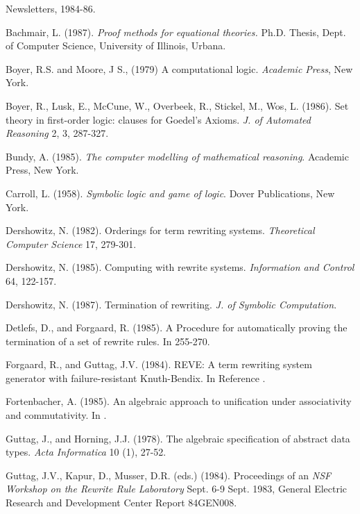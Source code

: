 \begin{thebibliography}{99}

 Newsletters, 1984-86.
 
Bachmair, L. (1987). {\em Proof methods for
equational theories.} Ph.D. Thesis, Dept. of Computer Science,
University of Illinois, Urbana.

Boyer, R.S. and Moore, J S., (1979) A computational logic.
{\em Academic Press}, New York.

Boyer, R., Lusk, E., McCune, W., Overbeek, R.,
Stickel, M., Wos, L. (1986). Set theory in first-order logic: clauses
for Goedel's Axioms. {\em J. of Automated Reasoning} 2, 3, 287-327.

Bundy, A. (1985). {\em The computer modelling of
mathematical reasoning}. Academic Press, New York.

Carroll, L. (1958). {\em Symbolic logic and game of
logic}.  Dover Publications, New York.

Dershowitz, N. (1982). Orderings for term
rewriting systems. {\em Theoretical Computer Science} 17, 279-301.

Dershowitz, N. (1985). Computing with
rewrite systems. {\em Information and Control} 64, 122-157.

Dershowitz, N. (1987). Termination of rewriting.
{\em J. of Symbolic Computation}.

Detlefs, D., and Forgaard, R. (1985). A
Procedure for automatically proving the termination of a set of
rewrite rules. 
In \cite{RTA85} 
255-270.

Forgaard, R., and Guttag, J.V. (1984). REVE:
A term rewriting system generator with failure-resistant Knuth-Bendix.
In Reference \cite{Guttagetal84}.

Fortenbacher, A. (1985). An algebraic approach
to unification under associativity and commutativity. 
In \cite{RTA85}.

Guttag, J., and Horning, J.J. (1978). The
algebraic specification of abstract data types. {\em Acta Informatica}
10 (1), 27-52.

Guttag, J.V., Kapur, D., Musser, D.R. (eds.)
(1984).  Proceedings of an {\em NSF Workshop on the Rewrite Rule
Laboratory} Sept. 6-9 Sept. 1983, General Electric Research and
Development Center Report 84GEN008.


\end{thebibliography}
